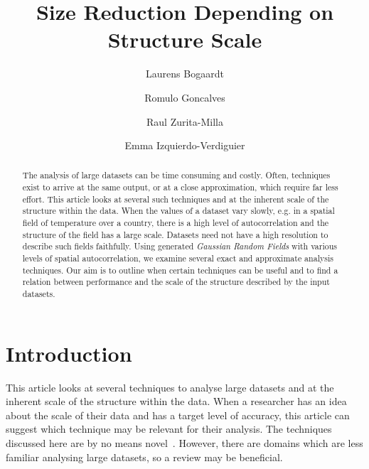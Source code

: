 \documentclass{acm_proc_article-sp}
\begin{document}
\title{\textbf{Size Reduction Depending on Structure Scale}}

\author[1]{Laurens Bogaardt}
\author[1]{Romulo Goncalves}
\author[2]{Raul Zurita-Milla}
\author[2,3]{Emma Izquierdo-Verdiguier}


\date{} %
\maketitle
\thispagestyle{empty} %

\begin{abstract}
The analysis of large datasets can be time consuming and costly. Often, techniques exist to arrive at the same output, or at a close approximation, which require far less effort. This article looks at several such techniques and at the inherent scale of the structure within the data. When the values of a dataset vary slowly, e.g. in a spatial field of temperature over a country, there is a high level of autocorrelation and the structure of the field has a large scale. Datasets need not have a high resolution to describe such fields faithfully. Using generated \textit{Gaussian Random Fields} with various levels of spatial autocorrelation, we examine several exact and approximate analysis techniques. Our aim is to outline when certain techniques can be useful and to find a relation between performance and the scale of the structure described by the input datasets.
\end{abstract}

\section{Introduction}
\label{sec:Introduction}

This article looks at several techniques to analyse large datasets and at the inherent scale of the structure within the data. When a researcher has an idea about the scale of their data and has a target level of accuracy, this article can suggest which technique may be relevant for their analysis. The techniques discussed here are by no means novel~\cite{Golub1970, Bjorck1973, Chan1982}. However, there are domains which are less familiar analysing large datasets, so a review may be beneficial.
\end{document}
